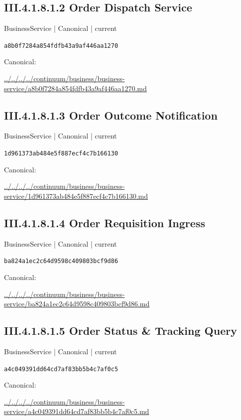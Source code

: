 \documentclass[10pt,a4paper]{article}
\begin{document}
\subsection*{III.4.1.8.1.2 Order Dispatch Service}
\label{element-a8b0f7284a854fdfb43a9af446aa1270}
{\small BusinessService | Canonical | current}\par
\texttt{a8b0f7284a854fdfb43a9af446aa1270}\par
Canonical: \par
{\footnotesize\url{../../../../continuum/business/business-service/a8b0f7284a854fdfb43a9af446aa1270.md}}\par
\subsection*{III.4.1.8.1.3 Order Outcome Notification}
\label{element-1d961373ab484e5f887ecf4c7b166130}
{\small BusinessService | Canonical | current}\par
\texttt{1d961373ab484e5f887ecf4c7b166130}\par
Canonical: \par
{\footnotesize\url{../../../../continuum/business/business-service/1d961373ab484e5f887ecf4c7b166130.md}}\par
\subsection*{III.4.1.8.1.4 Order Requisition Ingress}
\label{element-ba824a1ec2c64d9598c409803bcf9d86}
{\small BusinessService | Canonical | current}\par
\texttt{ba824a1ec2c64d9598c409803bcf9d86}\par
Canonical: \par
{\footnotesize\url{../../../../continuum/business/business-service/ba824a1ec2c64d9598c409803bcf9d86.md}}\par
\subsection*{III.4.1.8.1.5 Order Status \& Tracking Query}
\label{element-a4c049391dd64cd7af83bb5b4c7af0c5}
{\small BusinessService | Canonical | current}\par
\texttt{a4c049391dd64cd7af83bb5b4c7af0c5}\par
Canonical: \par
{\footnotesize\url{../../../../continuum/business/business-service/a4c049391dd64cd7af83bb5b4c7af0c5.md}}\par
\end{document}
